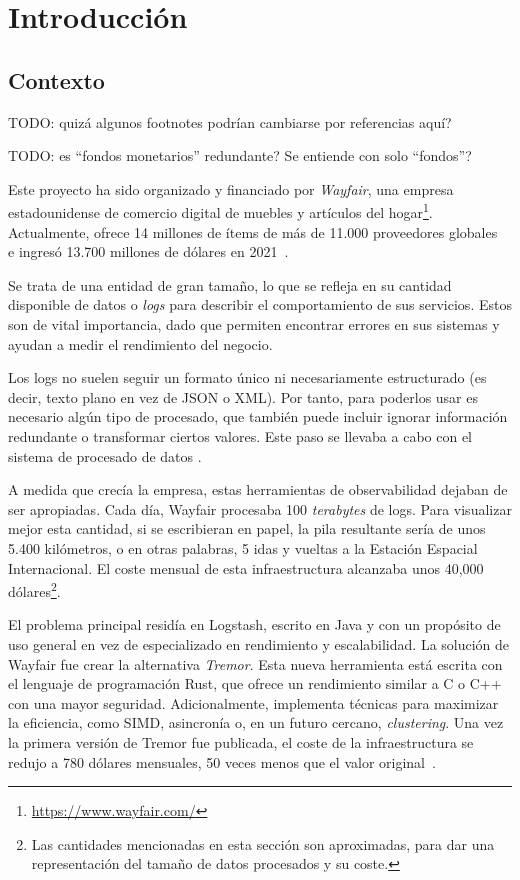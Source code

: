 
\chapter{Introducción}

\section{Contexto}

TODO: quizá algunos footnotes podrían cambiarse por referencias aquí?

TODO: es ``fondos monetarios'' redundante? Se entiende con solo ``fondos''?

Este proyecto ha sido organizado y financiado por \emph{Wayfair}, una empresa
estadounidense de comercio digital de muebles y artículos del
hogar\footnote{\url{https://www.wayfair.com/}}. Actualmente, ofrece 14 millones
de ítems de más de 11.000 proveedores globales~\cite{wayfairItems} e ingresó
13.700 millones de dólares en 2021~\cite{wayfairRevenue}.

Se trata de una entidad de gran tamaño, lo que se refleja en su cantidad
disponible de datos o \emph{logs} para describir el comportamiento de sus
servicios. Estos son de vital importancia, dado que permiten encontrar errores
en sus sistemas y ayudan a medir el rendimiento del negocio.

Los logs no suelen seguir un formato único ni necesariamente estructurado (es
decir, texto plano en vez de JSON o XML). Por tanto, para poderlos usar es
necesario algún tipo de procesado, que también puede incluir ignorar información
redundante o transformar ciertos valores. Este paso se llevaba a cabo con el
sistema de procesado de datos \textcite{logstash}.

A medida que crecía la empresa, estas herramientas de observabilidad dejaban de
ser apropiadas. Cada día, Wayfair procesaba 100 \emph{terabytes} de logs. Para
visualizar mejor esta cantidad, si se escribieran en papel, la pila resultante
sería de unos 5.400 kilómetros, o en otras palabras, 5 idas y vueltas a la
Estación Espacial Internacional. El coste mensual de esta infraestructura
alcanzaba unos 40,000 dólares\footnote{Las cantidades mencionadas en esta
sección son aproximadas, para dar una representación del tamaño de datos
procesados y su coste.}.

El problema principal residía en Logstash, escrito en Java y con un propósito de
uso general en vez de especializado en rendimiento y escalabilidad. La solución
de Wayfair fue crear la alternativa \emph{Tremor}. Esta nueva herramienta está
escrita con el lenguaje de programación Rust, que ofrece un rendimiento similar
a C o C++ con una mayor seguridad. Adicionalmente, implementa técnicas para
maximizar la eficiencia, como SIMD, asincronía o, en un futuro cercano,
\emph{clustering}. Una vez la primera versión de Tremor fue publicada, el coste
de la infraestructura se redujo a 780 dólares mensuales, 50 veces menos que el
valor original~\cite{tremorcon_lll}.

